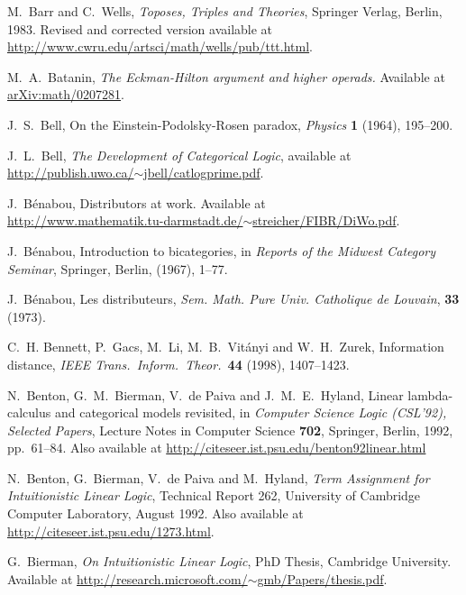 \documentclass[12pt,twoside,openright]{report}
\begin{document}
\begin{thebibliography}{99}
 M.\ Barr and C.\ Wells, {\sl Toposes, Triples and Theories}, Springer Verlag, Berlin, 1983.  Revised and corrected version available at \href{http://www.cwru.edu/artsci/math/wells/pub/ttt.html}{
http://www.cwru.edu/artsci/math/wells/pub/ttt.html}.

M.\ A.\ Batanin, {\sl The Eckman-Hilton argument and higher operads.}  Available at
\href{http://arxiv.org/abs/math/0207281}{arXiv:math/0207281}.

 J.\ S.\ Bell, On the Einstein-Podolsky-Rosen paradox, {\sl Physics} {\bf 1} (1964), 195--200.

 J.\ L.\ Bell, {\sl The Development of Categorical Logic}, available at \hfill \break
\href{http://publish.uwo.ca/~jbell/catlogprime.pdf}{http://publish.uwo.ca/$\sim$jbell/catlogprime.pdf}.

 J.\ B{\'e}nabou, Distributors at work. Available at \\
\href{http://www.mathematik.tu-darmstadt.de/~streicher/FIBR/DiWo.pdf}{http://www.mathematik.tu-darmstadt.de/$\sim$streicher/FIBR/DiWo.pdf}.

 J.\ B{\'e}nabou, Introduction to bicategories, in \textsl{Reports of the Midwest Category Seminar}, Springer, Berlin, (1967), 1--77.

 J.\ B{\'e}nabou, Les distributeurs, \textsl{Sem. Math. Pure Univ. Catholique de Louvain}, \textbf{33} (1973).

 C.\ H. Bennett, P.\ Gacs, M.\ Li, M.\ B.\ Vit\'anyi and W.\ H.\ Zurek, Information distance, \textit{IEEE Trans.\ 
Inform.\ Theor.\ }\textbf{44} (1998), 1407--1423.

 N.\ Benton, G.\ M.\ Bierman, V.\ de Paiva and J.\ M.\ E.\
Hyland, Linear lambda-calculus and categorical models revisited, in
{\sl Computer Science Logic (CSL'92), Selected Papers}, Lecture Notes in Computer Science {\bf 702}, Springer, Berlin, 1992, pp.\ 61--84. Also available at
\href{http://citeseer.ist.psu.edu/benton92linear.html}
{http://citeseer.ist.psu.edu/benton92linear.html}

 N.\ Benton, G.\ Bierman, V.\ de Paiva and M.\ Hyland,
{\sl Term Assignment for Intuitionistic Linear Logic}, Technical Report 262, University of Cambridge Computer Laboratory, August 1992. Also available at \href{http://citeseer.ist.psu.edu/1273.html}
{http://citeseer.ist.psu.edu/1273.html}.

 G.\ Bierman, {\sl On Intuitionistic Linear Logic}, PhD Thesis, Cambridge University.  Available at 
\href{http://research.microsoft.com/~gmb/Papers/thesis.pdf}
{http://research.microsoft.com/$\sim$gmb/Papers/thesis.pdf}.


\end{thebibliography}
\end{document}
